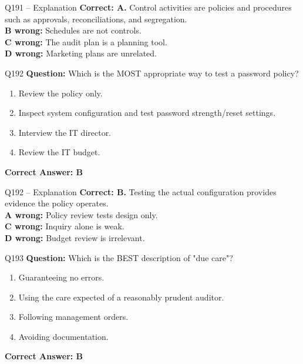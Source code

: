 \documentclass[aspectratio=169,10pt]{beamer}
\begin{document}
	\begin{frame}[t]{Q191 -- Explanation}
		\small
		\textbf{Correct: A.} Control activities are policies and procedures such as approvals, reconciliations, and segregation. \\[4pt]
		\textbf{B wrong:} Schedules are not controls. \\[2pt]
		\textbf{C wrong:} The audit plan is a planning tool. \\[2pt]
		\textbf{D wrong:} Marketing plans are unrelated.
	\end{frame}
	
	\begin{frame}[t]{Q192}
		\small
		\textbf{Question:} Which is the MOST appropriate way to test a password policy?
		\begin{enumerate}[label=\Alph*.,itemsep=1pt,topsep=2pt]
			\item Review the policy only.
			\item Inspect system configuration and test password strength/reset settings.
			\item Interview the IT director.
			\item Review the IT budget.
		\end{enumerate}
		\vspace{4pt}
		\textbf{Correct Answer: B}
	\end{frame}
	
	\begin{frame}[t]{Q192 -- Explanation}
		\small
		\textbf{Correct: B.} Testing the actual configuration provides evidence the policy operates. \\[4pt]
		\textbf{A wrong:} Policy review tests design only. \\[2pt]
		\textbf{C wrong:} Inquiry alone is weak. \\[2pt]
		\textbf{D wrong:} Budget review is irrelevant.
	\end{frame}
	
	\begin{frame}[t]{Q193}
		\small
		\textbf{Question:} Which is the BEST description of "due care"?
		\begin{enumerate}[label=\Alph*.,itemsep=1pt,topsep=2pt]
			\item Guaranteeing no errors.
			\item Using the care expected of a reasonably prudent auditor.
			\item Following management orders.
			\item Avoiding documentation.
		\end{enumerate}
		\vspace{4pt}
		\textbf{Correct Answer: B}
	\end{frame}
	
\end{document}
